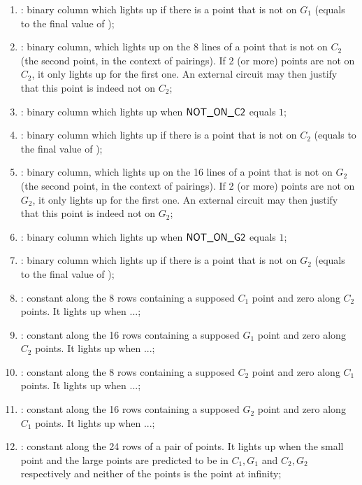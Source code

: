 \begin{enumerate}[resume]
      \item \notOnGOneAccMax: binary column which lights up if there is a point that is not on $G_1$ (equals to the final value of \notOnGOneAcc);
      \item \notOnCTwo{} \blsPrediction{}: binary column, which lights up on the 8 lines of a point that is not on $C_2$ (the second point, in the context of pairings). If 2 (or more) points are not on $C_2$, it only lights up for the first one. An external circuit may then justify that this point is indeed not on $C_2$;       
      \item \notOnCTwoAcc: binary column which lights up when $\textsf{NOT\_ON\_C2}$ equals $1$;    
      \item \notOnCTwoAccMax: binary column which lights up if there is a point that is not on $C_2$ (equals to the final value of \notOnCTwoAcc);
      \item \notOnGTwo{} \blsPrediction{}: binary column, which lights up on the 16 lines of a point that is not on $G_2$ (the second point, in the context of pairings). If 2 (or more) points are not on $G_2$, it only lights up for the first one. An external circuit may then justify that this point is indeed not on $G_2$;
      \item \notOnGTwoAcc: binary column which lights up when $\textsf{NOT\_ON\_G2}$ equals $1$;
      \item \notOnGTwoAccMax: binary column which lights up if there is a point that is not on $G_2$ (equals to the final value of \notOnGTwoAcc);
      \item \both{\cOneMembershipTestRequired}:
            constant along the 8 rows containing a supposed $C_1$ point and zero along $C_2$ points. It lights up when ...;
      \item \both{\gOneMembershipTestRequired}:
            constant along the 16 rows containing a supposed $G_1$ point and zero along $C_2$ points. It lights up when ...;
      \item \both{\cTwoMembershipTestRequired}:
            constant along the 8 rows containing a supposed $C_2$ point and zero along $C_1$ points. It lights up when ...;
      \item \both{\gTwoMembershipTestRequired}:
            constant along the 16 rows containing a supposed $G_2$ point and zero along $C_1$ points. It lights up when ...;
      \item \both{\acceptablePairOfPoints}: constant along the 24 rows of a pair of points. It lights up when the small point and the large points are predicted to be in $C_1,G_1$ and $C_2, G_2$ respectively and neither of the points is the point at infinity;
\end{enumerate}
     
    
   
   
     
     
      
     